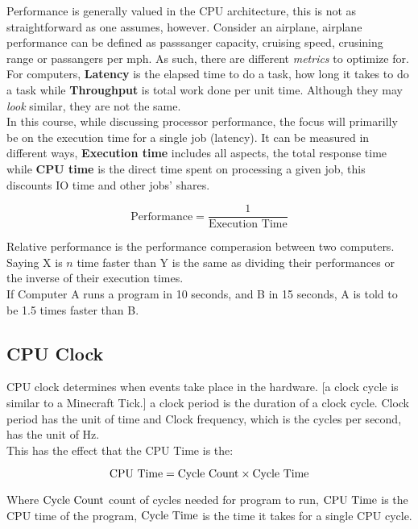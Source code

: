 \documentclass[11pt,a4paper,twocolumn]{book}
\begin{document}
Performance is generally valued in the CPU architecture, this is not as straightforward as one assumes, however. Consider an airplane, airplane performance can be defined as passsanger capacity, cruising speed, crusining range or passangers per mph. As such, there are different \textit{metrics} to optimize for.\\

For computers, \textbf{Latency} is the elapsed time to do a task, how long it takes to do a task while \textbf{Throughput} is total work done per unit time. Although they may \textit{look} similar, they are not the same.\\

In this course, while discussing processor performance, the focus will primarilly be on the execution time for a single job (latency). It can be measured in different ways, \textbf{Execution time} includes all aspects, the total response time while \textbf{CPU time} is the direct time spent on processing a given job, this discounts IO time and other jobs' shares.

\begin{equation}
\text{Performance} = \frac{1}{\text{Execution Time}}
\end{equation}

Relative performance is the performance comperasion between two computers. Saying X is $n$ time faster than Y is the same as dividing their performances or the inverse of their execution times.\\

If Computer A runs a program in 10 seconds, and B in 15 seconds, A is told to be 1.5 times faster than B.

\subsection{CPU Clock}

CPU clock determines when events take place in the hardware. [a clock cycle is similar to a Minecraft Tick.] a clock period is the duration of a clock cycle. Clock period has the unit of time and Clock frequency, which is the cycles per second, has the unit of Hz.\\

This has the effect that the CPU Time is the:

\begin{equation}
\text{CPU Time} = \text{Cycle Count} \times \text{Cycle Time} 
\end{equation}

Where $\text{Cycle Count}$ count of cycles needed for program to run, $\text{CPU Time}$ is the CPU time of the program, $\text{Cycle Time}$ is the time it takes for a single CPU cycle.
\end{document}
